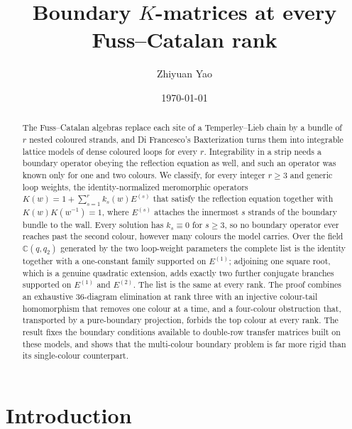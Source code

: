 \documentclass[
  aps,pre,
  reprint,
  superscriptaddress,
  amsmath,amssymb,
  floatfix
]{revtex4-2}
\theoremstyle{plain}
\theoremstyle{definition}
\theoremstyle{remark}
\begin{document}
\title{Boundary $K$-matrices at every Fuss--Catalan rank}

\author{Zhiyuan Yao}

\date{\today}

\begin{abstract}
The Fuss--Catalan algebras replace each site of a Temperley--Lieb chain by a
bundle of $r$ nested coloured strands, and Di Francesco's Baxterization turns
them into integrable lattice models of dense coloured loops for every $r$.
Integrability in a strip needs a boundary operator obeying the reflection
equation as well, and such an operator was known only for one and two colours.
We classify, for every integer $r\ge3$ and generic loop weights, the
identity-normalized meromorphic operators $K(w)=1+\sum_{s=1}^{r}k_s(w)E^{(s)}$
that satisfy the reflection equation together with $K(w)K(w^{-1})=1$, where
$E^{(s)}$ attaches the innermost $s$ strands of the boundary bundle to the
wall. Every solution has $k_s\equiv0$ for $s\ge3$, so no boundary operator ever
reaches past the second colour, however many colours the model carries. Over
the field $\mathbb{C}(q,q_2)$ generated by the two loop-weight parameters the
complete list is the identity together with a one-constant family supported on
$E^{(1)}$; adjoining one square root, which is a genuine quadratic extension,
adds exactly two further conjugate branches supported on $E^{(1)}$ and
$E^{(2)}$. The list is the same at every rank. The proof combines an exhaustive
$36$-diagram elimination at rank three with an injective colour-tail
homomorphism that removes one colour at a time, and a four-colour obstruction
that, transported by a pure-boundary projection, forbids the top colour at
every rank. The result fixes the boundary conditions available to double-row
transfer matrices built on these models, and shows that the multi-colour
boundary problem is far more rigid than its single-colour counterpart.
\end{abstract}

\maketitle

\section{Introduction}
\label{sec:intro}
\end{document}
